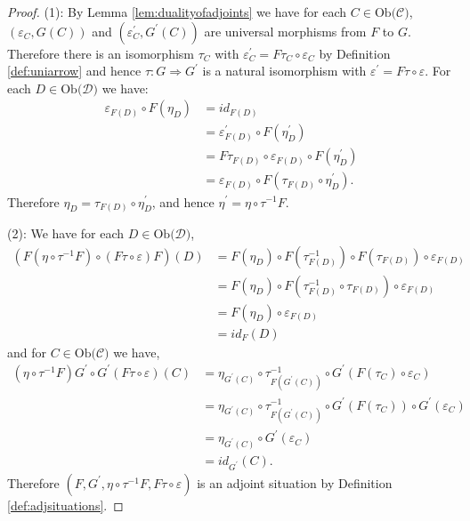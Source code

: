 \documentclass[11pt,a4paper]{article}
\theoremstyle{definition}
\newcommand\ob[1]{\mathrm{Ob(}#1\mathrm{)}}
\newcommand\cat[1]{\mathscr{#1}}
\newcommand\nattran[3]{#1\colon#2\Rightarrow#3}
\numberwithin{equation}{section}
\begin{document}
\begin{proof}
    (1): By Lemma \ref{lem:dualityofadjoints} we have for each $C\in\ob{\cat{C}}$,  $(\varepsilon_{C},G(C))$ and $(\varepsilon^\prime_{C},G^\prime(C))$ are universal morphisms from $F$ to $G$.
    Therefore there is an isomorphism $\tau_{C}$ with $\varepsilon_{C}^\prime=F\tau_{C} \circ\varepsilon_{C}$ by Definition \ref{def:uniarrow} and hence $\nattran{\tau}{G}{G^\prime}$ is a natural isomorphism with $\varepsilon^\prime=F\tau \circ\varepsilon$. For each $D\in\ob{\cat{D}}$ we have:
    \begin{align*}
        \varepsilon_{F(D)} \circ F(\eta_{D}) &= id_{F(D)}\\
        &= \varepsilon^\prime_{F(D)} \circ F(\eta^\prime_{D})\\
        &= F\tau_{F(D)}\circ\varepsilon_{F(D)} \circ F(\eta^\prime_{D})\\
        &= \varepsilon_{F(D)} \circ F(\tau_{F(D)}\circ \eta^\prime_{D}).
    \end{align*}
    Therefore $\eta_{D} = \tau_{F(D)} \circ \eta^\prime_{D}$, and hence $\eta^\prime=\eta\circ\tau^{-1}F$.
    
    (2): We have for each $D\in\ob{\cat{D}}$,
    \begin{align*}
        (F(\eta\circ\tau^{-1}F)\circ (F\tau\circ\varepsilon)F) (D) &= F(\eta_{D})\circ F(\tau^{-1}_{F(D)})\circ F(\tau_{F(D)})\circ\varepsilon_{F(D)} \\
        &= F(\eta_{D})\circ F(\tau^{-1}_{F(D)}\circ \tau_{F(D)})\circ\varepsilon_{F(D)} \\
        &= F(\eta_{D})\circ\varepsilon_{F(D)}\\
        &= id_{F} (D)
    \end{align*}
    and for $C\in\ob{\cat{C}}$ we have,
    \begin{align*}
        (\eta\circ\tau^{-1}F)G^\prime \circ G^\prime(F\tau\circ\varepsilon)(C) &= \eta_{G^\prime(C)}\circ\tau^{-1}_{F(G^\prime(C))} \circ G^\prime(F(\tau_{C})\circ\varepsilon_{C}) \\
        &= \eta_{G^\prime(C)}\circ\tau^{-1}_{F(G^\prime(C))} \circ G^\prime(F(\tau_{C}))\circ G^\prime(\varepsilon_{C})\\
        &= \eta_{G^\prime(C)}\circ G^\prime(\varepsilon_{C}) \\
        &=id_{G^\prime}(C).
    \end{align*}
    Therefore $(F,G^\prime,\eta\circ\tau^{-1}F,F\tau\circ\varepsilon)$ is an adjoint situation by Definition \ref{def:adjsituations}.
\end{proof}
\end{document}
